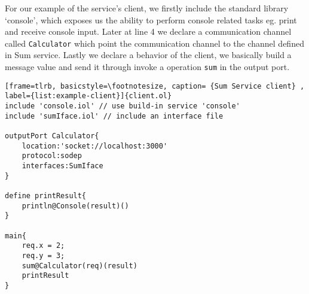 For our example of the service's client, we firstly include the standard library `console', which exposes us the ability to perform console related tasks eg. print and receive console input. Later at line 4 we declare a communication channel called \texttt{Calculator} which point the communication channel to the channel defined in Sum service. Lastly we declare a behavior of the client, we basically build a message value and send it through invoke a operation \texttt{sum} in the output port.

\begin{listing}[ht]
    \lstset{language=Jolie,
        style=codeStyle,
        numbers=left,
        firstnumber=1
    }
\begin{lstlisting}[frame=tlrb, basicstyle=\footnotesize, caption= {Sum Service client} , label={list:example-client}]{client.ol}
include 'console.iol' // use build-in service 'console'
include 'sumIface.iol' // include an interface file 

outputPort Calculator{
    location:'socket://localhost:3000'
    protocol:sodep 
    interfaces:SumIface
}

define printResult{
    println@Console(result)()
}

main{
    req.x = 2;
    req.y = 3;
    sum@Calculator(req)(result)
    printResult
}
\end{lstlisting}
\end{listing}

\FloatBarrier
